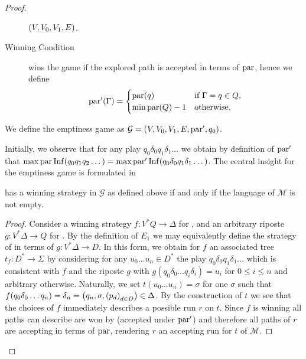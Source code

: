 \begin{proof}
\begin{definition}
\begin{description}
        $\left(V, V_{0}, V_{1}, E\right)$.
      \item [Winning Condition] \automaton wins the game if the explored path
        is accepted in terms of $\operatorname{par}$, hence we define
        \begin{equation*}
          \operatorname{par}'(\Gamma) = \begin{cases}
            \operatorname{par}(q)        &\text{if }\Gamma = q\in Q,\\
            \min\operatorname{par}(Q) - 1&\text{otherwise}.
          \end{cases}
        \end{equation*}
    \end{description}
    We define the emptiness game as 
    $\mathcal{G} = \left(V, V_{0}, V_{1}, E, \operatorname{par}', q_{0}\right)$.
  \end{definition}
  Initially, we observe that for any play 
  $q_{0}\delta_{0}q_{1}\delta_{1}\dots$ we obtain by definition of $\operatorname{par}'$
  that $\max\operatorname{par}\operatorname{Inf}(q_{0}q_{1}q_{2}\dots) = 
    \max\operatorname{par}'\operatorname{Inf}(q_{0}\delta_{0}q_{1}\delta_{1}\dots)$. The central 
  insight for the emptiness game is formulated in
  \begin{lemma}
    \automaton{} has a winning strategy in $\mathcal{G}$ as defined above
    if and only if the language of $\mathcal{M}$ is not empty.
  \end{lemma}
  \begin{proof}
    Consider a winning strategy $f:V^{*}Q\rightarrow\Delta$ for \automaton{},
    and an arbitrary riposte $g:V^{*}\Delta\rightarrow Q$ for \pathfinder{}. By
    the definition of $E_{1}$ we may equivalently define the strategy of 
    \pathfinder{} in terms of $g:V^{*}\Delta\rightarrow D$. In this form, we 
    obtain for $f$ an associated tree $t_{f}:D^{*}\rightarrow\Sigma$ by
    considering for any $u_{0}\dots u_{n}\in D^{*}$ the play 
    $q_{0}\delta_{0}q_{1}\delta_{1}\dots$ which is consistent with $f$ and the
    riposte $g$ with $g(q_{0}\delta_{0}\dots q_{i}\delta_{i}) = u_{i}$ for 
    $0\leq i\leq n$ and arbitrary otherwise. Naturally, we set 
    $t(u_{0}\dots u_{n}) = \sigma$ for one $\sigma$ such that 
    $f(q_{0}\delta_{0}\dots q_{n}) = \delta_{n} 
      = \left(q_{n}, \sigma, \left(p_{d}\right)_{d\in D}\right)\in\Delta$. By the 
    construction of $t$ we see that the choices of $f$ immediately describes a 
    possible run $r$ on $t$. Since $f$ is winning all paths \pathfinder{} can
    describe are won by \automaton{} (accepted under $\operatorname{par}'$) and therefore 
    all paths of $r$ are accepting in terms of $\operatorname{par}$, rendering $r$ an
    accepting run for $t$ of $\mathcal{M}$.


\end{proof}
\end{proof}

